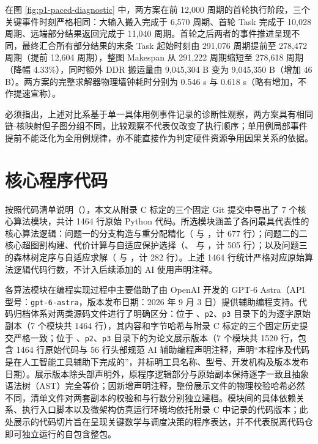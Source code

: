 \documentclass[anonymous,notoc]{gmcm2026}
\begin{document}
在图 \ref{fig:p1-paced-diagnostic} 中，两方案在前 12,000 周期的首轮执行阶段，三个关键事件时刻严格相同：大输入搬入完成于 6,570 周期、首轮 Task 完成于 10,028 周期、远端部分结果返回完成于 11,040 周期。首轮之后两者的事件推进呈现不同，最终汇合所有部分结果的末条 Task 起始时刻由 291,076 周期提前至 278,472 周期（提前 12,604 周期），整图 Makespan 从 291,222 周期缩短至 278,618 周期（降幅 4.33\%），同时额外 DDR 搬运量由 9,045,304 B 变为 9,045,350 B（增加 46 B）。两方案的完整求解器物理墙钟耗时分别为 0.546 s 与 0.618 s（略有增加，不作提速宣称）。

必须指出，上述对比系基于单一具体用例事件记录的诊断性观察，两方案具有相同链-核映射但子图分组不同，比较观察不代表仅改变了执行顺序；单用例局部事件提前不能泛化为全用例规律，亦不能直接作为判定硬件资源争用因果关系的依据。

\FloatBarrier
\section{核心程序代码}

按照代码清单说明（\texttt{}），本文从附录 C 标定的三个固定 Git 提交中导出了 7 个核心算法模块，共计 1464 行原始 Python 代码。所选模块涵盖了各问最具代表性的核心算法逻辑：问题一的分支构造与重分配精化（\texttt{} 与 \texttt{}，计 677 行）；问题二的二核心超图割构建、代价计算与自适应保护选择（\texttt{}、\texttt{} 与 \texttt{}，计 505 行）；以及问题三的森林树定序与自适应求解（\texttt{} 与 \texttt{}，计 282 行）。上述 1464 行统计严格对应原始算法逻辑代码行数，不计入后续添加的 AI 使用声明注释。

各算法模块在编程实现过程中主要借助了由 OpenAI 开发的 GPT-6 Astra（API 型号：\texttt{gpt-6-astra}，版本发布日期：2026 年 9 月 3 日）提供辅助编程支持。代码归档体系对两类源码文件进行了明确区分：位于 \texttt{}、\texttt{p2}、\texttt{p3} 目录下的为逐字原始副本（7 个模块共 1464 行），其内容和字节哈希与附录 C 标定的三个固定历史提交严格一致；位于 \texttt{}、\texttt{p2}、\texttt{p3} 目录下的为论文展示版本（7 个模块共 1520 行，包含 1464 行原始代码与 56 行头部规范 AI 辅助编程声明注释，声明``本程序及代码是在人工智能工具辅助下完成的''，并标明工具名称、型号、开发机构及版本发布日期）。展示版本除头部声明外，原程序逻辑部分与原始副本保持逐字一致且抽象语法树（AST）完全等价；因新增声明注释，整份展示文件的物理校验哈希必然不同，清单文件对两套副本的校验和与行数分别独立建档。模块间的具体依赖关系、执行入口脚本以及微架构仿真运行环境均依托附录 C 中记录的代码版本；此处展示的代码切片旨在呈现关键数学与调度决策的程序表达，并不代表脱离代码仓即可独立运行的自包含整包。
\end{document}
